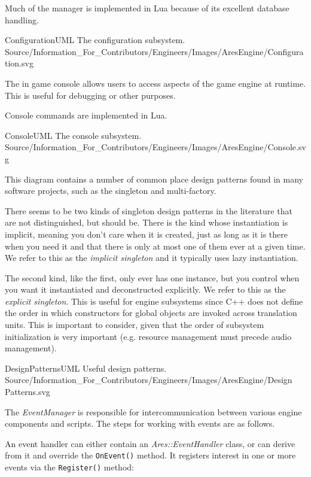 Much of the manager is implemented in Lua because of its excellent database handling.

\FullPageLandscapeDiagram
    {ConfigurationUML}
    {The configuration subsystem.}
    {Source/Information_For_Contributors/Engineers/Images/AresEngine/Configuration.svg}

\page
{}
The in game console allows users to access aspects of the game engine at runtime. This is useful for debugging or other purposes.

Console commands are implemented in Lua.

\FullPageLandscapeDiagram
    {ConsoleUML}
    {The console subsystem.}
    {Source/Information_For_Contributors/Engineers/Images/AresEngine/Console.svg}

\page
{}
This diagram contains a number of common place design patterns found in many software projects, such as the singleton and multi-factory. 

There seems to be two kinds of singleton design patterns in the literature that are not distinguished, but should be. There is the kind whose instantiation is implicit, meaning you don't care when it is created, just as long as it is there when you need it and that there is only at most one of them ever at a given time. We refer to this as the {\it implicit singleton} and it typically uses lazy instantiation.

The second kind, like the first, only ever has one instance, but you control when you want it instantiated and deconstructed explicitly. We refer to this as the {\it explicit singleton}. This is useful for engine subsystems since C++ does not define the order in which constructors for global objects are invoked across translation units. This is important to consider, given that the order of subsystem initialization is very important (e.g. resource management must precede audio management).

\FullPageLandscapeDiagram
    {DesignPatternsUML}
    {Useful design patterns.}
    {Source/Information_For_Contributors/Engineers/Images/AresEngine/Design Patterns.svg}

\page 
{}
The {\it EventManager} is responsible for intercommunication between various engine components and scripts. The steps for working with events are as follows.

An event handler can either contain an {\it Ares::EventHandler} class, or can derive from it and override the {\tt OnEvent()} method. It registers interest in one or more events via the {\tt Register()} method:

